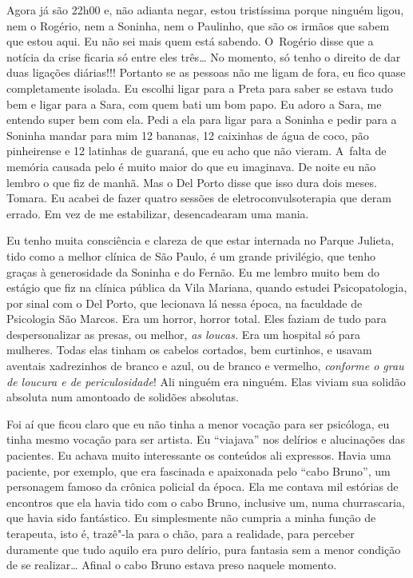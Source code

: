 Agora já são 22h00 e, não adianta negar, estou tristíssima porque
ninguém ligou, nem o Rogério, nem a Soninha, nem o Paulinho, que são os
irmãos que sabem que estou aqui. Eu não sei mais quem está sabendo. O~Rogério disse que a notícia da crise ficaria só entre eles três…
No momento, só tenho o direito de dar duas ligações diárias!!! Portanto
se as pessoas não me ligam de fora, eu fico quase completamente isolada.
Eu escolhi ligar para a Preta para saber se estava tudo bem e ligar para
a Sara, com quem bati um bom papo. Eu adoro a Sara, me entendo super bem
com ela. Pedi a ela para ligar para a Soninha e pedir para a Soninha
mandar para mim 12 bananas, 12 caixinhas de água de coco, pão
pinheirense e 12 latinhas de guaraná, que eu acho que não vieram. A~falta de memória causada pelo  é muito maior do que eu imaginava. De
noite eu não lembro o que fiz de manhã. Mas o Del Porto disse que isso
dura dois meses. Tomara. Eu acabei de fazer quatro sessões de
eletroconvulsoterapia que deram errado. Em vez de me estabilizar,
desencadearam uma mania.

Eu tenho muita consciência e clareza de que estar internada no Parque
Julieta, tido como a melhor clínica de São Paulo, é um grande
privilégio, que tenho graças à generosidade da Soninha e do Fernão. Eu
me lembro muito bem do estágio que fiz na clínica pública da Vila
Mariana, quando estudei Psicopatologia, por sinal com o Del Porto, que
lecionava lá nessa época, na faculdade de Psicologia São Marcos. Era um
horror, horror total. Eles faziam de tudo para despersonalizar as
presas, ou melhor, \emph{as loucas.} Era um hospital só para mulheres.
Todas elas tinham os cabelos cortados, bem curtinhos, e usavam aventais
xadrezinhos de branco e azul, ou de branco e vermelho, \emph{conforme o
grau de loucura e de periculosidade}! Ali ninguém era ninguém. Elas
viviam sua solidão absoluta num amontoado de solidões absolutas.

Foi aí que ficou claro que eu não tinha a menor vocação para ser
psicóloga, eu tinha mesmo vocação para ser artista. Eu ``viajava'' nos
delírios e alucinações das pacientes. Eu achava muito interessante os
conteúdos ali expressos. Havia uma paciente, por exemplo, que era
fascinada e apaixonada pelo ``cabo Bruno'', um personagem famoso da
crônica policial da época. Ela me contava mil estórias de encontros que
ela havia tido com o cabo Bruno, inclusive um, numa churrascaria, que
havia sido fantástico. Eu simplesmente não cumpria a minha função de
terapeuta, isto é, trazê"-la para o chão, para a realidade, para perceber
duramente que tudo aquilo era puro delírio, pura fantasia sem a menor
condição de se realizar… Afinal o cabo Bruno estava preso naquele
momento.

